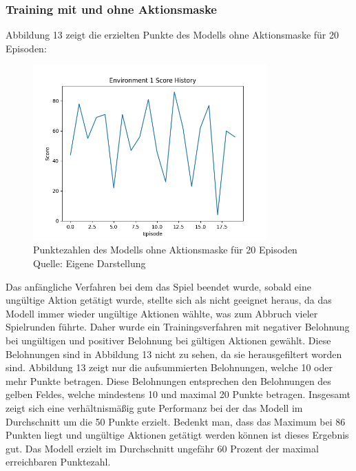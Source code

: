 \subsubsection{Training mit und ohne Aktionsmaske}
Abbildung 13 zeigt die erzielten Punkte des Modells ohne Aktionsmaske für 20 Episoden:
\nopagebreak
\begin{figure}[H]
	\centering
	\includegraphics[width=0.8\textwidth]{Bilder/trainingwithoutcancalation} 
	\caption[Punktezahlen des Modells ohne Aktionsmaske für 20 Episoden]{Punktezahlen des Modells ohne Aktionsmaske für 20 Episoden\\ Quelle: Eigene Darstellung}
\end{figure}

Das anfängliche Verfahren bei dem das Spiel beendet wurde, sobald eine ungültige Aktion getätigt wurde, stellte sich als nicht geeignet heraus, da das Modell immer wieder ungültige Aktionen wählte, was zum Abbruch vieler Spielrunden führte. Daher wurde ein Trainingsverfahren mit negativer Belohnung bei ungültigen und positiver Belohnung bei gültigen Aktionen gewählt. Diese Belohnungen sind in Abbildung 13 nicht zu sehen, da sie herausgefiltert worden sind. Abbildung 13 zeigt nur die aufsummierten Belohnungen, welche 10 oder mehr Punkte betragen. Diese Belohnungen entsprechen den Belohnungen des gelben Feldes, welche mindestens 10 und maximal 20 Punkte betragen. Insgesamt zeigt sich eine verhältnismäßig gute Performanz bei der das Modell im Durchschnitt um die 50 Punkte erzielt. Bedenkt man, dass das Maximum bei 86 Punkten liegt und ungültige Aktionen getätigt werden können ist dieses Ergebnis gut. Das Modell erzielt im Durchschnitt ungefähr 60 Prozent der maximal erreichbaren Punktezahl.\\

